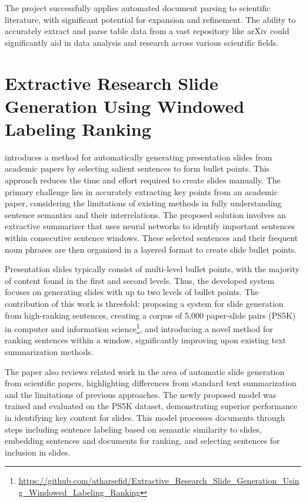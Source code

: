 The project successfully applies automated document parsing to scientific literature, with significant potential for expansion and refinement. The ability to accurately extract and parse table data from a vast repository like arXiv could significantly aid in data analysis and research across various scientific fields.


\section{Extractive Research Slide Generation Using Windowed Labeling Ranking}

\citet{Sefid:2021:arXiv} introduces a method for automatically generating presentation slides from academic papers by selecting salient sentences to form bullet points. This approach reduces the time and effort required to create slides manually. The primary challenge lies in accurately extracting key points from an academic paper, considering the limitations of existing methods in fully understanding sentence semantics and their interrelations. The proposed solution involves an extractive summarizer that uses neural networks to identify important sentences within consecutive sentence windows. These selected sentences and their frequent noun phrases are then organized in a layered format to create slide bullet points.

Presentation slides typically consist of multi-level bullet points, with the majority of content found in the first and second levels. Thus, the developed system focuses on generating slides with up to two levels of bullet points. The contribution of this work is threefold: proposing a system for slide generation from high-ranking sentences, creating a corpus of 5,000 paper-slide pairs (PS5K) in computer and information science\footnote{\url{https://github.com/atharsefid/Extractive_Research_Slide_Generation_Using_Windowed_Labeling_Ranking}}, and introducing a novel method for ranking sentences within a window, significantly improving upon existing text summarization methods.

The paper also reviews related work in the area of automatic slide generation from scientific papers, highlighting differences from standard text summarization and the limitations of previous approaches. The newly proposed model was trained and evaluated on the PS5K dataset, demonstrating superior performance in identifying key content for slides. This model processes documents through steps including sentence labeling based on semantic similarity to slides, embedding sentences and documents for ranking, and selecting sentences for inclusion in slides.

